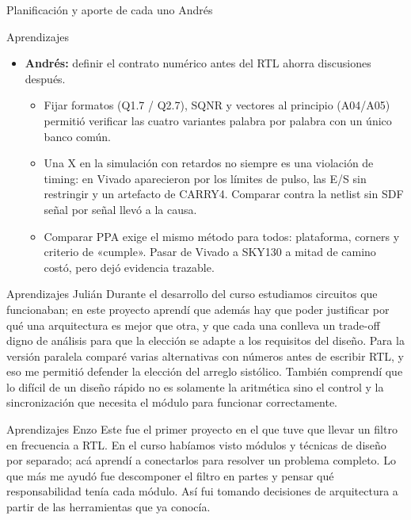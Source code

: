 \documentclass[aspectratio=169,11pt]{beamer}
\newcommand{\presenta}[1]{\hfill{\normalfont\small\color{gray}#1}}
\begin{document}
\begin{frame}{Planificación y aporte de cada uno \presenta{Andrés}}
  \centering
  \resizebox{!}{0.82\textheight}{}
\end{frame}

\begin{frame}{Aprendizajes}
  \begin{itemize}
    \item \textbf{Andrés:} definir el contrato numérico antes del RTL ahorra discusiones después.
    \begin{itemize}\footnotesize
      \item Fijar formatos (Q1.7 / Q2.7), SQNR y vectores al principio (A04/A05) permitió verificar las cuatro variantes palabra por palabra con un único banco común.
      \item Una X en la simulación con retardos no siempre es una violación de timing: en Vivado aparecieron por los límites de pulso, las E/S sin restringir y un artefacto de CARRY4. Comparar contra la netlist sin SDF señal por señal llevó a la causa.
      \item Comparar PPA exige el mismo método para todos: plataforma, corners y criterio de «cumple». Pasar de Vivado a SKY130 a mitad de camino costó, pero dejó evidencia trazable.
    \end{itemize}
  \end{itemize}
\end{frame}

\begin{frame}{Aprendizajes \presenta{Julián}}
  Durante el desarrollo del curso estudiamos circuitos que funcionaban; en este proyecto aprendí que además hay que poder justificar por qué una arquitectura es mejor que otra, y que cada una conlleva un trade-off digno de análisis para que la elección se adapte a los requisitos del diseño.
  Para la versión paralela comparé varias alternativas con números antes de escribir RTL, y eso me permitió defender la elección del arreglo sistólico. 
  También comprendí que lo difícil de un diseño rápido no es solamente la aritmética sino el control y la sincronización que necesita el módulo para funcionar correctamente.
\end{frame}

\begin{frame}{Aprendizajes \presenta{Enzo}}
  Este fue el primer proyecto en el que tuve que llevar un filtro en frecuencia a RTL. En el curso habíamos visto módulos y técnicas de diseño por separado; acá aprendí a conectarlos para resolver un problema completo. Lo que más me ayudó fue descomponer el filtro en partes y pensar qué responsabilidad tenía cada módulo. Así fui tomando decisiones de arquitectura a partir de las herramientas que ya conocía.
\end{frame}
\end{document}
